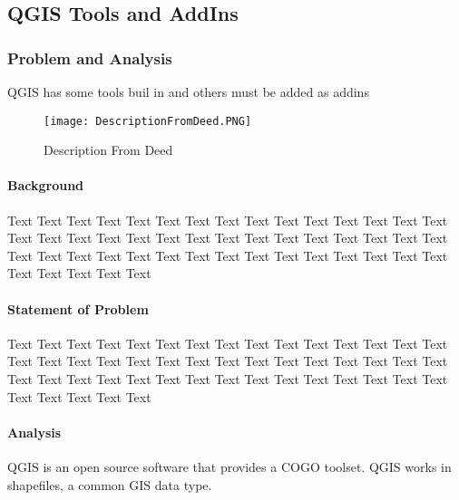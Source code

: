 %
%
%
  \def\titlename{QGIS Tools and AddIns}
  \def\authorName{Allegan County GIS Services}
  \def\pdfTitle{QGIS Addins}
  \def\pdfSubject{QGIS Tools and AddIns} %
  \def\pdfKeywords{mobile,gis}
  

\subsection{QGIS Tools and AddIns}
\subsubsection{Problem and Analysis}
QGIS has some tools buil in and others must be added as addins
\begin{figure}[h!]
\centering
    \texttt{[image: DescriptionFromDeed.PNG]}
\vspace{-.2in}

\caption{Description From Deed}
\end{figure}
\begin{adjmulticols}{2}{\innerMar}{\outerMar}
\paragraph{Background}
\noindent Text Text Text Text Text Text Text Text Text Text Text 
Text Text Text Text Text Text Text Text Text Text Text Text Text
Text Text Text Text Text Text Text Text Text Text Text Text Text
Text Text Text Text Text Text Text Text Text Text Text Text Text
\paragraph{Statement of Problem}
\noindent Text Text Text Text Text Text Text Text Text Text Text 
Text Text Text Text Text Text Text Text Text Text Text Text Text
Text Text Text Text Text Text Text Text Text Text Text Text Text
Text Text Text Text Text Text Text Text Text Text Text Text Text
\paragraph{Analysis}
\noindent QGIS is an open source software that provides a COGO toolset.  QGIS works in shapefiles, a common GIS data type.
\end{adjmulticols}
\clearpage
